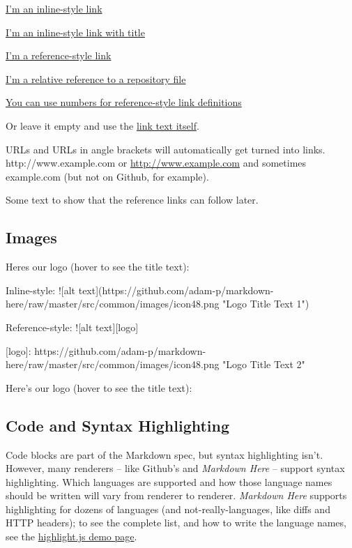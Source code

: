 \documentclass[
]{tufte-pandoc}
\newenvironment{Shaded}{}{}
\newcommand{\NormalTok}[1]{#1}
\begin{document}
\href{https://www.google.com}{I'm an inline-style link}

\href{https://www.google.com}{I'm an inline-style link with title}

\href{https://www.mozilla.org}{I'm a reference-style link}

\href{../blob/master/LICENSE}{I'm a relative reference to a repository
file}

\href{http://slashdot.org}{You can use numbers for reference-style link
definitions}

Or leave it empty and use the \href{http://www.reddit.com}{link text
itself}.

URLs and URLs in angle brackets will automatically get turned into
links. http://www.example.com or \url{http://www.example.com} and
sometimes example.com (but not on Github, for example).

Some text to show that the reference links can follow later.

\hypertarget{images}{%
\subsection{Images}\label{images}}

\begin{Shaded}
\begin{Highlighting}[]
\NormalTok{Here\textquotesingle{}s our logo (hover to see the title text):}

\NormalTok{Inline{-}style:}
\NormalTok{![alt text](https://github.com/adam{-}p/markdown{-}here/raw/master/src/common/images/icon48.png "Logo Title Text 1")}

\NormalTok{Reference{-}style:}
\NormalTok{![alt text][logo]}

\NormalTok{[logo]: https://github.com/adam{-}p/markdown{-}here/raw/master/src/common/images/icon48.png "Logo Title Text 2"}
\end{Highlighting}
\end{Shaded}

Here's our logo (hover to see the title text):

\hypertarget{code-and-syntax-highlighting}{%
\subsection{Code and Syntax
Highlighting}\label{code-and-syntax-highlighting}}

Code blocks are part of the Markdown spec, but syntax highlighting
isn't. However, many renderers -- like Github's and \emph{Markdown Here}
-- support syntax highlighting. Which languages are supported and how
those language names should be written will vary from renderer to
renderer. \emph{Markdown Here} supports highlighting for dozens of
languages (and not-really-languages, like diffs and HTTP headers); to
see the complete list, and how to write the language names, see the
\href{http://softwaremaniacs.org/media/soft/highlight/test.html}{highlight.js
demo page}.
\end{document}
